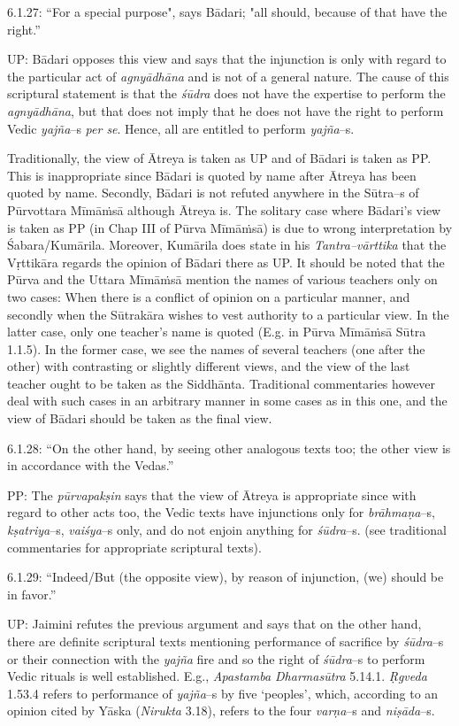 6.1.27: “For a special purpose", says Bādari; "all should, because of that have the right.”

UP: Bādari opposes this view and says that the injunction is only with regard to the particular act of \textit{agnyādhāna} and is not of a general nature. The cause of this scriptural statement is that the \textit{śūdra} does not have the expertise to perform the \textit{agnyādhāna}, but that does not imply that he does not have the right to perform Vedic \textit{yajña}–s \textit{per se}. Hence, all are entitled to perform \textit{yajña}–s.

Traditionally, the view of Ātreya is taken as UP and of Bādari is taken as PP. This is inappropriate since Bādari is quoted by name after Ātreya has been quoted by name. Secondly, Bādari is not refuted anywhere in the Sūtra–s of Pūrvottara Mīmāṁsā although Ātreya is. The solitary case where Bādari’s view is taken as PP (in Chap III of Pūrva Mīmāṁsā) is due to wrong interpretation by Śabara/Kumārila. Moreover, Kumārila does state in his \textit{Tantra–vārttika} that the Vṛttikāra regards the opinion of Bādari there as UP. It should be noted that the Pūrva and the Uttara Mīmāṁsā mention the names of various teachers only on two cases: When there is a conflict of opinion on a particular manner, and secondly when the Sūtrakāra wishes to vest authority to a particular view. In the latter case, only one teacher’s name is quoted (E.g. in Pūrva Mīmāṁsā Sūtra 1.1.5). In the former case, we see the names of several teachers (one after the other) with contrasting or slightly different views, and the view of the last teacher ought to be taken as the Siddhānta. Traditional commentaries however deal with such cases in an arbitrary manner in some cases as in this one, and the view of Bādari should be taken as the final view.

6.1.28: “On the other hand, by seeing other analogous texts too; the other view is in accordance with the Vedas.”

PP: The \textit{pūrvapakṣin} says that the view of Ātreya is appropriate since with regard to other acts too, the Vedic texts have injunctions only for \textit{brāhmaṇa}–s, \textit{kṣatriya}–s, \textit{vaiśya}–s only, and do not enjoin anything for \textit{śūdra}–s. (see traditional commentaries for appropriate scriptural texts).

6.1.29: “Indeed/But (the opposite view), by reason of injunction, (we) should be in favor.”

UP: Jaimini refutes the previous argument and says that on the other hand, there are definite scriptural texts mentioning performance of sacrifice by \textit{śūdra}–s or their connection with the \textit{yajña} fire and so the right of \textit{śūdra}–s to perform Vedic rituals is well established. E.g., \textit{Apastamba Dharmasūtra} 5.14.1. \textit{Ṛgveda} 1.53.4 refers to performance of \textit{yajña}–s by five ‘peoples’, which, according to an opinion cited by Yāska (\textit{Nirukta} 3.18), refers to the four \textit{varṇa}–s and \textit{niṣāda}–s.

